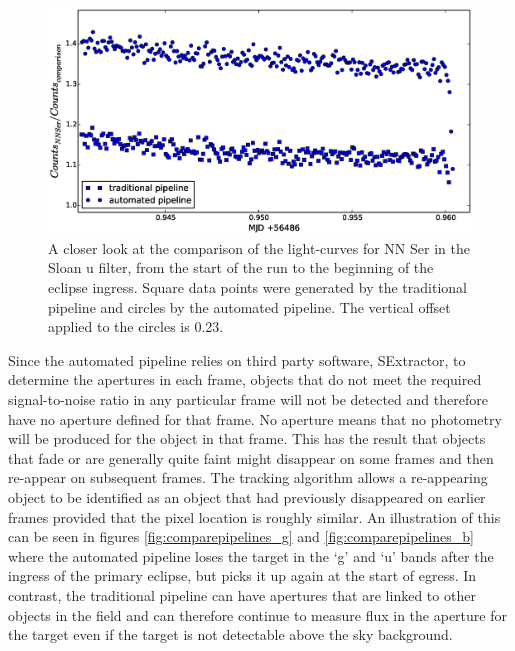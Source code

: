 \begin{figure}
\centering
\includegraphics[width=140mm]{images/nn_ser_compare_zoom_b.eps}
\caption{A closer look at the comparison of the light-curves for NN Ser in the Sloan u filter, from the start of the run to the beginning of the eclipse ingress. Square data points were generated by the traditional pipeline and circles by the automated pipeline. The vertical offset applied to the circles is 0.23. }
\label{fig:comparepipelines_zoom_b}
\end{figure}

Since the automated pipeline relies on third party software, SExtractor, to determine the apertures in each frame, objects that do not meet the required signal-to-noise ratio in any particular frame will not be detected and therefore have no aperture defined for that frame. No aperture means that no photometry will be produced for the object in that frame. This has the result that objects that fade or are generally quite faint might disappear on some frames and then re-appear on subsequent frames. The tracking algorithm allows a re-appearing object to be identified as an object that had previously disappeared on earlier frames provided that the pixel location is roughly similar. An illustration of this can be seen in figures \ref{fig:comparepipelines_g} and \ref{fig:comparepipelines_b} where the automated pipeline loses the target in the `g' and `u' bands after the ingress of the primary eclipse, but picks it up again at the start of egress. In contrast, the traditional pipeline can have apertures that are linked to other objects in the field and can therefore continue to measure flux in the aperture for the target even if the target is not detectable above the sky background.

